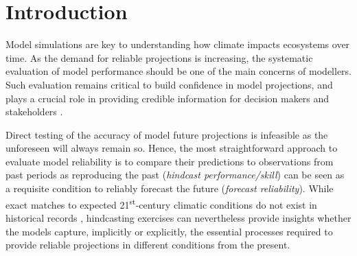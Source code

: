 \section{Introduction}\label{intro}

Model simulations are key to understanding how climate impacts ecosystems over time. As the demand for reliable projections is increasing, the systematic evaluation of model performance should be one of the main concerns of modellers. Such evaluation remains critical to build confidence in model projections, and plays a crucial role in providing credible information for decision makers and stakeholders \cite{Dawson2011, Mouquet2015}.

Direct testing of the accuracy of model future projections is infeasible as the unforeseen will always remain so. Hence, the most straightforward approach to evaluate model reliability is to compare their predictions to observations from past periods as reproducing the past (\emph{hindcast performance/skill}) can be seen as a requisite condition to reliably forecast the future (\emph{forecast reliability}). While exact matches to expected 21\textsuperscript{st}-century climatic conditions do not exist in historical records \cite{Burke2018}, hindcasting exercises can nevertheless provide insights whether the models capture, implicitly or explicitly, the essential processes required to provide reliable projections in different conditions from the present.

